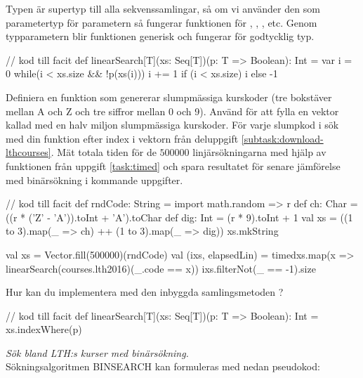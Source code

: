Typen  är supertyp till alla sekvenssamlingar, så om vi använder den som parametertyp för parametern  så fungerar funktionen för , , , etc. Genom typparametern  blir funktionen generisk och fungerar för godtycklig typ. 


\begin{Code}
// kod till facit
def linearSearch[T](xs: Seq[T])(p: T => Boolean): Int = {
  var i = 0
  while(i < xs.size && !p(xs(i))) i += 1 
  if (i < xs.size) i else -1
}
\end{Code}



\Subtask \label{subtask:linsearch-rndCode} Definiera en funktion  som genererar slumpmässiga kurskoder (tre bokstäver mellan A och Z och tre siffror mellan 0 och 9). Använd  för att fylla en vektor kallad  med en halv miljon slumpmässiga kurskoder. För varje slumpkod i  sök med din funktion  efter index i vektorn  från deluppgift \ref{subtask:download-lthcourses}. Mät totala tiden för de $500000$ linjärsökningarna med hjälp av funktionen  från uppgift \ref{task:timed} och spara resultatet för senare jämförelse med binärsökning i kommande uppgifter.

 

\begin{Code}
// kod till facit
def rndCode: String = {
  import math.{random => r}
  def ch: Char = ((r * ('Z' - 'A')).toInt + 'A').toChar
  def dig: Int   = (r * 9).toInt + 1
  val xs = ((1 to 3).map(_ => ch) ++ (1 to 3).map(_ => dig))
  xs.mkString
}

val xs = Vector.fill(500000)(rndCode)
val (ixs, elapsedLin) = 
  timed{xs.map(x => linearSearch(courses.lth2016)(_.code == x))}
ixs.filterNot(_ == -1).size
\end{Code}



\Subtask\Pen Hur kan du implementera  med den inbyggda samlingsmetoden ?

\begin{Code}
// kod till facit
def linearSearch[T](xs: Seq[T])(p: T => Boolean): Int = 
  xs.indexWhere(p)
\end{Code}



\Task \emph{Sök bland LTH:s kurser med binärsökning.} \\Sökningsalgoritmen BINSEARCH kan formuleras med nedan pseudokod:

